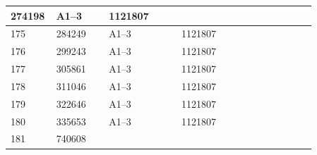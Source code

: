 \documentclass[UTF8,10pt,a4paper,fontset=fandol]{ctexart}
\newcommand{\fieldvalue}[1]{#1}
\begin{document}
\begin{tabular}{|p{0.07\linewidth}|p{0.16\linewidth}|p{0.22\linewidth}|p{0.23\linewidth}|p{0.18\linewidth}|}
\fieldvalue{274198} &
\fieldvalue{A1--3} &
\fieldvalue{1121807} & \\
\hline
\fieldvalue{175} &
\fieldvalue{284249} &
\fieldvalue{A1--3} &
\fieldvalue{1121807} & \\
\hline
\fieldvalue{176} &
\fieldvalue{299243} &
\fieldvalue{A1--3} &
\fieldvalue{1121807} & \\
\hline
\fieldvalue{177} &
\fieldvalue{305861} &
\fieldvalue{A1--3} &
\fieldvalue{1121807} & \\
\hline
\fieldvalue{178} &
\fieldvalue{311046} &
\fieldvalue{A1--3} &
\fieldvalue{1121807} & \\
\hline
\fieldvalue{179} &
\fieldvalue{322646} &
\fieldvalue{A1--3} &
\fieldvalue{1121807} & \\
\hline
\fieldvalue{180} &
\fieldvalue{335653} &
\fieldvalue{A1--3} &
\fieldvalue{1121807} & \\
\hline
\fieldvalue{181} &
\fieldvalue{740608} &

\end{tabular}
\end{document}

